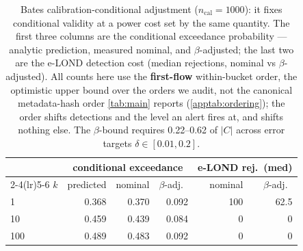 \begin{table}[t]
\centering
\caption{Bates calibration-conditional adjustment ($n_{\text{cal}}=1000$): it fixes conditional
validity at a power cost set by the same quantity. The first three columns are the conditional
exceedance probability --- analytic prediction, measured nominal, and $\beta$-adjusted; the last
two are the e-LOND detection cost (median rejections, nominal vs $\beta$-adjusted). All counts here use the \textbf{first-flow} within-bucket order, the optimistic upper bound over the orders we audit, not the canonical metadata-hash order \cref{tab:main} reports (\cref{apptab:ordering}); the order shifts detections and the level an alert fires at, and shifts nothing else. The
$\beta$-bound requires 0.22--0.62 of $\lvert C\rvert$
across error targets $\delta\in[0.01,0.2]$.}
\label{apptab:bates}
\begin{tabular}{lrrrrr}
\toprule
 & \multicolumn{3}{c}{conditional exceedance} & \multicolumn{2}{c}{e-LOND rej.\ (med)} \\
\cmidrule(lr){2-4}\cmidrule(lr){5-6}
$k$ & predicted & nominal & $\beta$-adj.\ & nominal & $\beta$-adj.\ \\
\midrule
1 & 0.368 & 0.370 & 0.092 & 100 & 62.5 \\
10 & 0.459 & 0.439 & 0.084 & 0 & 0 \\
100 & 0.489 & 0.483 & 0.092 & 0 & 0 \\
\bottomrule
\end{tabular}
\end{table}
